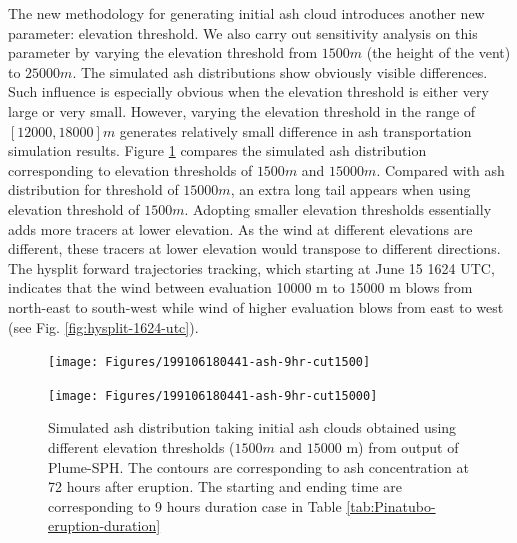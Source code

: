 \documentclass[draft,linenumbers]{agujournal2019}
\begin{document}
The new methodology for generating initial ash cloud introduces another new parameter: elevation threshold. We also carry out sensitivity analysis on this parameter by varying the elevation threshold from $1500 m$ (the height of the vent) to $25000 m$. The simulated ash distributions show obviously visible differences. Such influence is especially obvious when the elevation threshold is either very large or very small. However, varying the elevation threshold in the range of $[12000, 18000] m$ generates relatively small difference in ash transportation simulation results. Figure \ref{fig:Puff-sensitivity-elevation-threshold} compares the simulated ash distribution corresponding to elevation thresholds of $1500 m$ and $15000 m$. Compared with ash distribution for threshold of $15000 m$, an extra long tail appears when using elevation threshold of $1500 m$. Adopting smaller elevation thresholds essentially adds more tracers at lower elevation. As the wind at different elevations are different, these tracers at lower elevation would transpose to different directions. The  hysplit \citep{stein2015noaa, rolph2017real} forward trajectories tracking, which starting at June 15 1624 UTC, indicates that the wind between evaluation 10000 m to 15000 m blows from north-east to south-west while wind of higher evaluation blows from east to west (see Fig. \ref{fig:hysplit-1624-utc}). 

\begin{figure}[!htb]
    \centering
    \begin{minipage}{.325\textwidth}
        \centering
        \texttt{[image: Figures/199106180441-ash-9hr-cut1500]}
    \end{minipage}%
    \begin{minipage}{.325 \textwidth}
        \centering
        \texttt{[image: Figures/199106180441-ash-9hr-cut15000]}
    \end{minipage}%
    \caption{Simulated ash distribution taking initial ash clouds obtained using different elevation thresholds ($1500 m$ and $15000$ m) from output of Plume-SPH. The contours are corresponding to ash concentration at 72 hours after eruption. The starting and ending time are corresponding to 9 hours duration case in Table \ref{tab:Pinatubo-eruption-duration}}
    \label{fig:Puff-sensitivity-elevation-threshold}
\end{figure}
\end{document}
